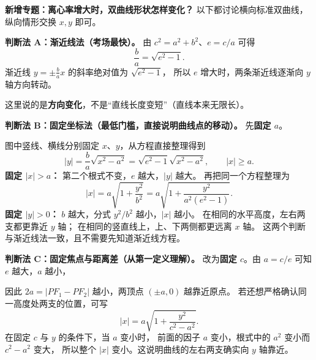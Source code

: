 \begin{proofbox}
\textbf{新增专题：离心率增大时，双曲线形状怎样变化？}
以下都讨论横向标准双曲线，纵向情形交换 $x,y$ 即可。

\medskip
\textbf{判断法 A：渐近线法（考场最快）。}
由 $c^2=a^2+b^2$、$e=c/a$ 可得
\[
 \boxed{\frac{b}{a}=\sqrt{e^2-1}}.
\]
渐近线 $y=\pm\frac ba x$ 的斜率绝对值为 $\sqrt{e^2-1}$，
所以 $e$ 增大时，两条渐近线逐渐向 $y$ 轴方向转动。

这里说的是\textbf{方向变化}，不是“直线长度变短”（直线本来无限长）。

\medskip
\end{proofbox}
\clearpage
\begin{proofbox}
\textbf{判断法 B：固定坐标法（最低门槛，直接说明曲线点的移动）。}
先\textbf{固定 $a$}。

图中竖线、横线分别固定 $x$、$y$，从方程直接整理得到
\[
 |y|=\frac ba\sqrt{x^2-a^2}
 =\sqrt{e^2-1}\sqrt{x^2-a^2},\qquad |x|\ge a.
\]
\textbf{固定 $|x|>a$：} 第二个根式不变，$e$ 越大，$|y|$ 越大。
再把同一个方程整理为
\[
 |x|=a\sqrt{1+\frac{y^2}{b^2}}
 =a\sqrt{1+\frac{y^2}{a^2(e^2-1)}}.
\]
\textbf{固定 $|y|>0$：} $b$ 越大，分式 $y^2/b^2$ 越小，$|x|$ 越小。
在相同的水平高度，左右两支都更靠近 $y$ 轴；
在相同的竖直线上，上、下两侧都更远离 $x$ 轴。
这两个判断与渐近线法一致，且不需要先知道渐近线方程。

\medskip
\end{proofbox}
\clearpage
\begin{proofbox}
\textbf{判断法 C：固定焦点与距离差（从第一定义理解）。}
改为\textbf{固定 $c$}。由 $a=c/e$ 可知 $e$ 越大，$a$ 越小，

因此 $2a=|PF_1-PF_2|$ 越小，两顶点 $(\pm a,0)$ 越靠近原点。
若还想严格确认同一高度处两支的位置，可写
\[
 |x|=a\sqrt{1+\frac{y^2}{c^2-a^2}}.
\]
在固定 $c$ 与 $y$ 的条件下，当 $a$ 变小时，
前面的因子 $a$ 变小，根式中的 $a^2$ 变小而 $c^2-a^2$ 变大，
所以整个 $|x|$ 变小。这说明曲线的左右两支确实向 $y$ 轴靠近。
\end{proofbox}
\clearpage

